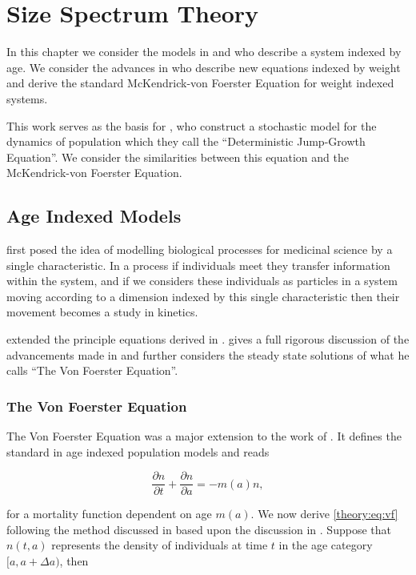 \documentclass[../main.tex]{subfiles}
\begin{document}
  \chapter{Size Spectrum Theory}\label{chapter:sizetheory}

  In this chapter we consider the models in \cite{mckendrick1926} and \cite{foerster1959} who describe a system indexed by age. We consider the advances in \cite{silvert1978} who describe new equations indexed by weight and derive the standard McKendrick-von Foerster Equation for weight indexed systems.

  This work serves as the basis for \cite{datta2010}, who construct a stochastic model for the dynamics of population which they call the ``Deterministic Jump-Growth Equation''. We consider the similarities between this equation and the McKendrick-von Foerster Equation.

  \section{Age Indexed Models}
  \cite{mckendrick1926} first posed the idea of modelling biological processes for medicinal science by a single characteristic. In a process if individuals meet they transfer information within the system, and if we considers these individuals as particles in a system moving according to a dimension indexed by this single characteristic then their movement becomes a study in kinetics.

  \cite{foerster1959} extended the principle equations derived in \cite{mckendrick1926}. \cite{trucco1965} gives a full rigorous discussion of the advancements made in \cite{foerster1959} and further considers the steady state solutions of what he calls ``The Von Foerster Equation''.

  \subsection{The Von Foerster Equation}
  The Von Foerster Equation was a major extension to the work of \cite{mckendrick1926}. It defines the standard in age indexed population models and reads

  \begin{equation}\label{theory:eq:vf}
    \frac{\partial n}{\partial t} + \frac{\partial n}{\partial a} = - m(a)n,
  \end{equation}

  for a mortality function dependent on age $m(a)$. We now derive \autoref{theory:eq:vf} following the method discussed in \cite{trucco1965} based upon the discussion in \cite{foerster1959}. Suppose that $n(t, a)$ represents the density of individuals at time $t$ in the age category $[a, a + \Delta a)$, then
\end{document}
